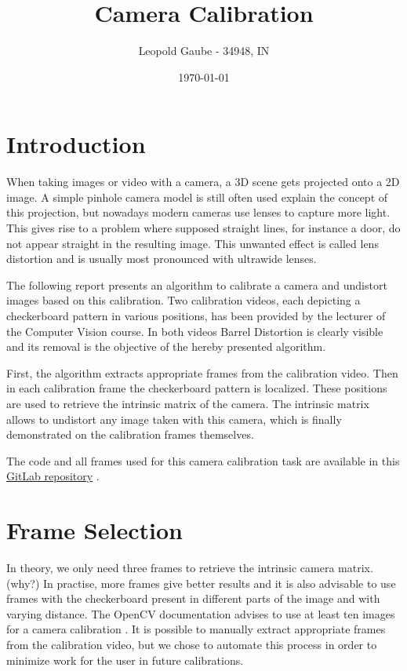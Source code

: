 \documentclass[bibliography=totoc]{scrartcl}
\title{Camera Calibration}
\author{Leopold Gaube - 34948, IN}
\date{\today}
\begin{document}
\maketitle
\tableofcontents

\clearpage

\section{Introduction}

When taking images or video with a camera, a 3D scene gets projected onto a 2D image.
A simple pinhole camera model is still often used explain the concept of this projection, but nowadays modern cameras use lenses to capture more light.
This gives rise to a problem where supposed straight lines, for instance a door, do not appear straight in the resulting image. 
This unwanted effect is called lens distortion and is usually most pronounced with ultrawide lenses.

The following report presents an algorithm to calibrate a camera and undistort images based on this calibration.
Two calibration videos, each depicting a checkerboard pattern in various positions, has been provided by the lecturer of the Computer Vision course.
In both videos Barrel Distortion is clearly visible and its removal is the objective of the hereby presented algorithm.

First, the algorithm extracts appropriate frames from the calibration video.
Then in each calibration frame the checkerboard pattern is localized.
These positions are used to retrieve the intrinsic matrix of the camera. 
The intrinsic matrix allows to undistort any image taken with this camera, which is finally demonstrated on the calibration frames themselves.

The code and all frames used for this camera calibration task are available in this \href{https://gitlab.com/gaubeleo/camera-calibration}{GitLab repository} \cite{Gitlab}.

\section{Frame Selection}
In theory, we only need three frames to retrieve the intrinsic camera matrix. (why?)
In practise, more frames give better results and it is also advisable to use frames with the checkerboard present in different parts of the image and with varying distance.
The OpenCV documentation advises to use at least ten images for a camera calibration \cite{CameraCalibration}.
It is possible to manually extract appropriate frames from the calibration video, but we chose to automate this process in order to minimize work for the user in future calibrations. 
\end{document}
